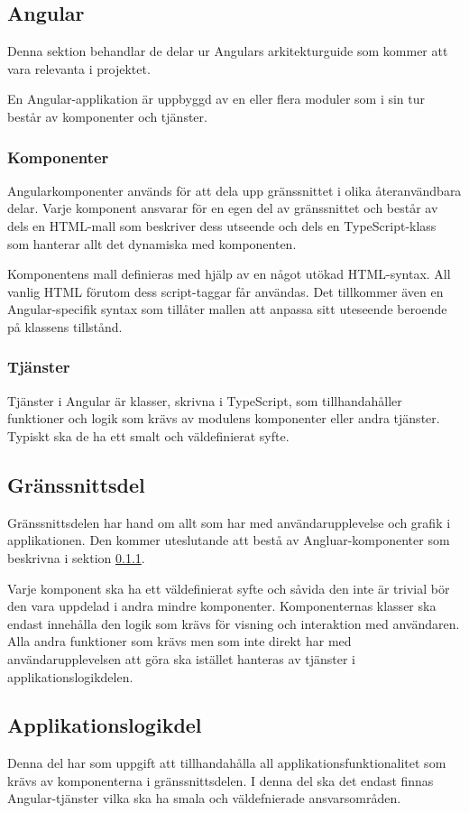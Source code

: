 \documentclass[a4paper,10pt]{article}
\begin{document}
\subsection{Angular}
Denna sektion behandlar de delar ur Angulars arkitekturguide \cite{angularguide} som kommer att vara relevanta i projektet.

En Angular-applikation är uppbyggd av en eller flera moduler som i sin tur består av komponenter och tjänster.
\subsubsection{Komponenter}
\label{sec:komponent}
Angularkomponenter används för att dela upp gränssnittet i olika återanvändbara delar. Varje komponent ansvarar för en egen del av gränssnittet och består av dels en HTML-mall som beskriver dess utseende och dels en TypeScript-klass som hanterar allt det dynamiska med komponenten.

Komponentens mall definieras med hjälp av en något utökad HTML-syntax. All vanlig HTML förutom dess script-taggar får användas. Det tillkommer även en Angular-specifik syntax som tillåter mallen att anpassa sitt uteseende beroende på klassens tillstånd.
\subsubsection{Tjänster}
Tjänster i Angular är klasser, skrivna i TypeScript, som tillhandahåller funktioner och logik som krävs av modulens komponenter eller andra tjänster. Typiskt ska de ha ett smalt och väldefinierat syfte.

\subsection{Gränssnittsdel}
Gränssnittsdelen har hand om allt som har med användarupplevelse och grafik i applikationen. Den kommer uteslutande att bestå av Angluar-komponenter som beskrivna i sektion \ref{sec:komponent}.

Varje komponent ska ha ett väldefinierat syfte och såvida den inte är trivial bör den vara uppdelad i andra mindre komponenter. Komponenternas klasser ska endast innehålla den logik som krävs för visning och interaktion med användaren. Alla andra funktioner som krävs men som inte direkt har med användarupplevelsen att göra ska istället hanteras av tjänster i applikationslogikdelen.

\subsection{Applikationslogikdel}
Denna del har som uppgift att tillhandahålla all applikationsfunktionalitet som krävs av komponenterna i gränssnittsdelen. I denna del ska det endast finnas Angular-tjänster vilka ska ha smala och väldefnierade ansvarsområden.
\end{document}
